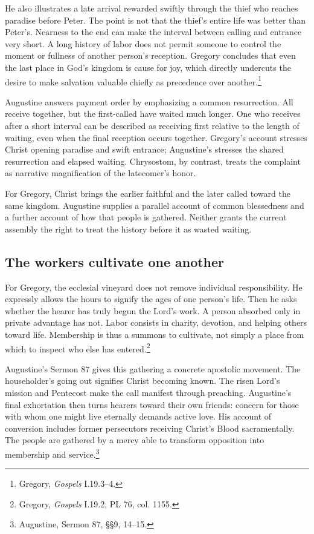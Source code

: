 He also illustrates a late arrival rewarded swiftly through the thief who reaches paradise before Peter. The point is not that the thief's entire life was better than Peter's. Nearness to the end can make the interval between calling and entrance very short. A long history of labor does not permit someone to control the moment or fullness of another person's reception. Gregory concludes that even the last place in God's kingdom is cause for joy, which directly undercuts the desire to make salvation valuable chiefly as precedence over another.\footnote{Gregory, \textit{Gospels} I.19.3--4.}

Augustine answers payment order by emphasizing a common resurrection. All receive together, but the first-called have waited much longer. One who receives after a short interval can be described as receiving first relative to the length of waiting, even when the final reception occurs together. Gregory's account stresses Christ opening paradise and swift entrance; Augustine's stresses the shared resurrection and elapsed waiting. Chrysostom, by contrast, treats the complaint as narrative magnification of the latecomer's honor.

For Gregory, Christ brings the earlier faithful and the later called toward the same kingdom. Augustine supplies a parallel account of common blessedness and a further account of how that people is gathered. Neither grants the current assembly the right to treat the history before it as wasted waiting.

\subsection{The workers cultivate one another}
For Gregory, the ecclesial vineyard does not remove individual responsibility. He expressly allows the hours to signify the ages of one person's life. Then he asks whether the hearer has truly begun the Lord's work. A person absorbed only in private advantage has not. Labor consists in charity, devotion, and helping others toward life. Membership is thus a summons to cultivate, not simply a place from which to inspect who else has entered.\footnote{Gregory, \textit{Gospels} I.19.2, PL 76, col. 1155.}

Augustine's Sermon 87 gives this gathering a concrete apostolic movement. The householder's going out signifies Christ becoming known. The risen Lord's mission and Pentecost make the call manifest through preaching. Augustine's final exhortation then turns hearers toward their own friends: concern for those with whom one might live eternally demands active love. His account of conversion includes former persecutors receiving Christ's Blood sacramentally. The people are gathered by a mercy able to transform opposition into membership and service.\footnote{Augustine, Sermon 87, §§9, 14--15.}

